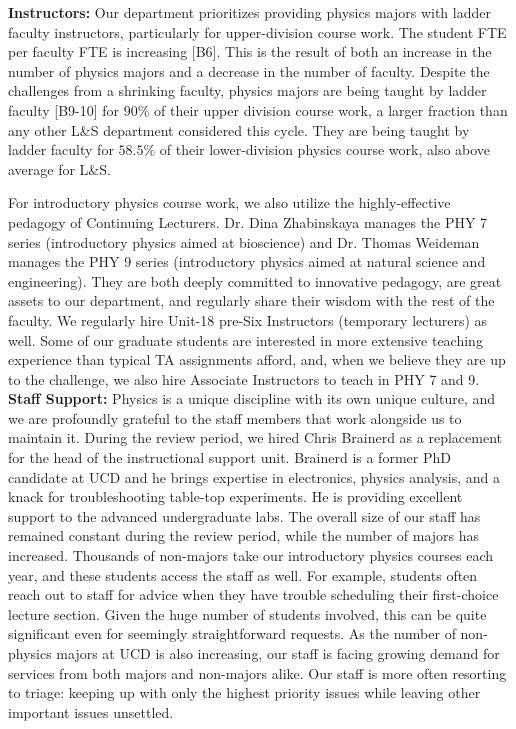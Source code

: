 \documentclass[12pt]{article}
\begin{document}
\noindent
{\bf Instructors:} Our department prioritizes providing physics majors
with ladder faculty instructors, particularly for upper-division
course work.  The student FTE per faculty FTE is increasing [B6].
This is the result of both an increase in the number of physics majors
and a decrease in the number of faculty.  Despite the challenges from
a shrinking faculty, physics majors are being taught by ladder faculty
[B9-10] for $90\%$ of their upper division course work, a larger
fraction than any other L\&S department considered this cycle.  They
are being taught by ladder faculty for $58.5\%$ of their
lower-division physics course work, also above average for L\&S.

For introductory physics course work, we also utilize the
highly-effective pedagogy of Continuing Lecturers.  Dr. Dina
Zhabinskaya manages the PHY 7 series (introductory physics aimed at
bioscience) and Dr. Thomas Weideman manages the PHY 9 series (introductory
physics aimed at natural science and engineering).  They are both
deeply committed to innovative pedagogy, are great assets to our
department, and regularly share their wisdom with the rest of the
faculty.  We regularly hire Unit-18 pre-Six Instructors (temporary
lecturers) as well.  Some of our graduate students are interested in
more extensive teaching experience than typical TA assignments afford,
and, when we believe they are up to the challenge, we also hire
Associate Instructors to teach in PHY 7 and 9.\\[3pt]

\noindent
{\bf Staff Support:} Physics is a unique discipline with its own
unique culture, and we are profoundly grateful to the staff members
that work alongside us to maintain it.  During the review period, we hired Chris Brainerd as a replacement for the head of the instructional support unit.  Brainerd is a former PhD candidate at UCD and he brings expertise in electronics, physics analysis, and a knack for troubleshooting table-top experiments.  He is providing excellent support to the advanced undergraduate labs. The overall size of our staff has remained constant during the review period, while the number of majors has increased.  Thousands of non-majors take our introductory physics courses each year, and these students access the staff as well.  For example, students often reach out to staff for advice when they have trouble scheduling their first-choice lecture section.  Given the huge number of students involved, this can be quite significant even for seemingly straightforward requests.  As the number of non-physics majors at UCD is also increasing, our staff is facing growing demand for services from both majors and non-majors alike.   Our staff is more often resorting to triage: keeping up with only the highest priority issues while leaving other important issues unsettled.\\[3pt]
\end{document}
